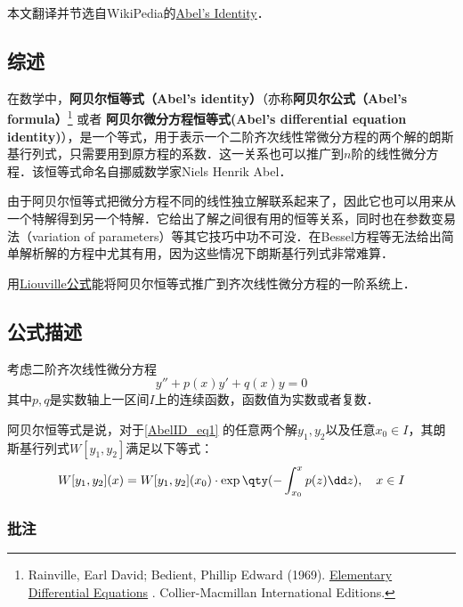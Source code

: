 
本文翻译并节选自WikiPedia的\href{https://en.wikipedia.org/wiki/Abel\%27s_identity}{Abel's Identity}．


\subsection{综述}

在数学中，\textbf{阿贝尔恒等式（Abel's identity）}（亦称\textbf{阿贝尔公式（Abel's formula）}\footnote{ Rainville, Earl David; Bedient, Phillip Edward (1969). \href{https://archive.org/details/elementarydiffer00rain}{ Elementary Differential Equations} . Collier-Macmillan International Editions.} 或者 \textbf{阿贝尔微分方程恒等式(Abel's differential equation identity)}），是一个等式，用于表示一个二阶齐次线性常微分方程的两个解的朗斯基行列式，只需要用到原方程的系数．这一关系也可以推广到$n$阶的线性微分方程．该恒等式命名自挪威数学家Niels Henrik Abel．

由于阿贝尔恒等式把微分方程不同的线性独立解联系起来了，因此它也可以用来从一个特解得到另一个特解．它给出了解之间很有用的恒等关系，同时也在参数变易法（variation of parameters）等其它技巧中功不可没．在Bessel方程等无法给出简单解析解的方程中尤其有用，因为这些情况下朗斯基行列式非常难算．

用\href{https://en.wikipedia.org/wiki/Liouville\%27s_formula}{Liouville公式}能将阿贝尔恒等式推广到齐次线性微分方程的一阶系统上．



\subsection{公式描述}

考虑二阶齐次线性微分方程
\begin{equation}\label{AbelID_eq1}
y'' + p(x)y' +q(x)y = 0
\end{equation}
其中$p, q$是实数轴上一区间$I$上的连续函数，函数值为实数或者复数．

阿贝尔恒等式是说，对于\autoref{AbelID_eq1} 的任意两个解$y_1, y_2$以及任意$x_0\in I$，其朗斯基行列式$W[y_1, y_2]$满足以下等式：
\begin{equation}\label{AbelID_eq4}
W[y_1, y_2](x) = W[y_1, y_2](x_0)\cdot \exp\qty(-\int _{x_0}^x p(z)\dd z), \quad x\in I
\end{equation}


\subsubsection{批注}

